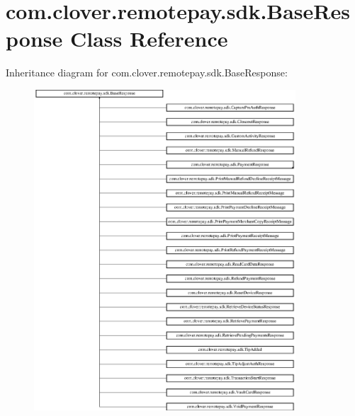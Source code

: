 \hypertarget{classcom_1_1clover_1_1remotepay_1_1sdk_1_1_base_response}{}\section{com.\+clover.\+remotepay.\+sdk.\+Base\+Response Class Reference}
\label{classcom_1_1clover_1_1remotepay_1_1sdk_1_1_base_response}


 


Inheritance diagram for com.\+clover.\+remotepay.\+sdk.\+Base\+Response\+:\begin{figure}[H]
\begin{center}
\leavevmode
\includegraphics[height=12.000000cm]{classcom_1_1clover_1_1remotepay_1_1sdk_1_1_base_response}
\end{center}
\end{figure}
